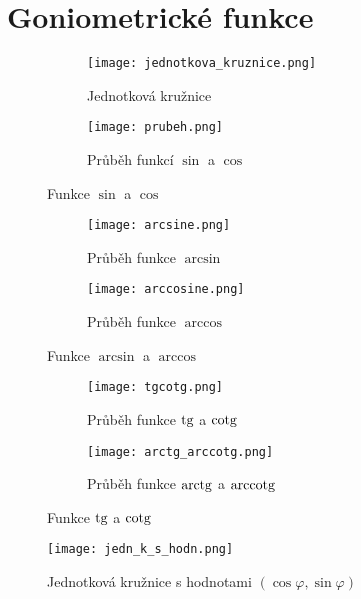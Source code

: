 \appendix
\section{Goniometrické funkce}\label{appa}

\begin{figure}[ht!]
     \centering
     \begin{subfigure}{0.26\textwidth}
         \centering
         \texttt{[image: jednotkova\_kruznice.png]}
         \caption{Jednotková kružnice}
     \end{subfigure}
     \begin{subfigure}{0.65\textwidth}
         \centering
         \texttt{[image: prubeh.png]}
         \caption{Průběh funkcí $\sin$ a $\cos$}
     \end{subfigure}
     \caption{Funkce $\sin$ a $\cos$}
\end{figure}

\begin{figure}[ht!]
     \centering
     \begin{subfigure}{0.49\textwidth}
         \centering
         \texttt{[image: arcsine.png]}
         \caption{Průběh funkce $\arcsin$}
     \end{subfigure}
     \begin{subfigure}{0.49\textwidth}
         \centering
         \texttt{[image: arccosine.png]}
         \caption{Průběh funkce $\arccos$}
     \end{subfigure}
     \caption{Funkce $\arcsin$ a $\arccos$}
\end{figure}

\begin{figure}[ht!]
     \centering
     \begin{subfigure}{0.49\textwidth}
         \centering
         \texttt{[image: tgcotg.png]}
         \caption{Průběh funkce $\operatorname{tg}$ a $\operatorname{cotg}$}
     \end{subfigure}
     \begin{subfigure}{0.49\textwidth}
         \centering
         \texttt{[image: arctg\_arccotg.png]}
         \caption{Průběh funkce $\operatorname{arctg}$ a $\operatorname{arccotg}$}
     \end{subfigure}
     \caption{Funkce $\operatorname{tg}$ a $\operatorname{cotg}$}
\end{figure}

\begin{figure}[ht!]
     \centering
     \texttt{[image: jedn\_k\_s\_hodn.png]}
     \caption{Jednotková kružnice s hodnotami $(\cos \varphi, \sin \varphi)$}
     \label{kruzsh}
\end{figure}


